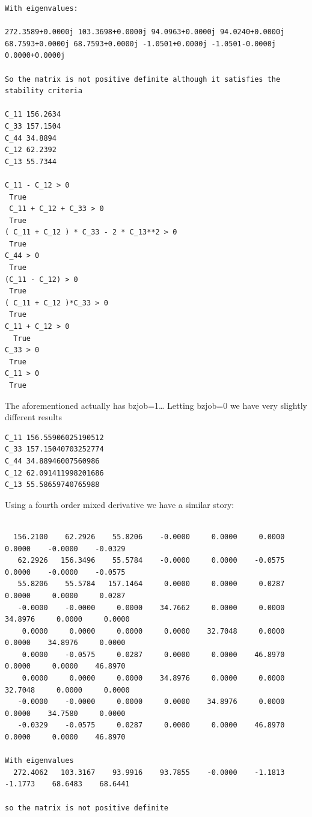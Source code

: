 \documentclass[11pt]{article}
\begin{document}
\begin{enumerate}
\begin{enumerate}
\begin{enumerate}
\begin{enumerate}
\begin{verbatim}
With eigenvalues:

272.3589+0.0000j 103.3698+0.0000j 94.0963+0.0000j 94.0240+0.0000j 68.7593+0.0000j 68.7593+0.0000j -1.0501+0.0000j -1.0501-0.0000j 0.0000+0.0000j

So the matrix is not positive definite although it satisfies the stability criteria

C_11 156.2634
C_33 157.1504
C_44 34.8894
C_12 62.2392
C_13 55.7344

C_11 - C_12 > 0 
 True
 C_11 + C_12 + C_33 > 0 
 True
( C_11 + C_12 ) * C_33 - 2 * C_13**2 > 0 
 True
C_44 > 0 
 True
(C_11 - C_12) > 0
 True
( C_11 + C_12 )*C_33 > 0 
 True
C_11 + C_12 > 0
  True
C_33 > 0
 True
C_11 > 0
 True

\end{verbatim}

The aforementioned actually has bzjob=1\ldots{}
Letting bzjob=0 we have very slightly different results 
\begin{verbatim}
C_11 156.55906025190512
C_33 157.15040703252774
C_44 34.88946007560986
C_12 62.091411998201686
C_13 55.58659740765988
\end{verbatim}


Using a fourth order mixed derivative we have a similar story:

\begin{verbatim}

  156.2100    62.2926    55.8206    -0.0000     0.0000     0.0000     0.0000    -0.0000    -0.0329
   62.2926   156.3496    55.5784    -0.0000     0.0000    -0.0575     0.0000    -0.0000    -0.0575
   55.8206    55.5784   157.1464     0.0000     0.0000     0.0287     0.0000     0.0000     0.0287
   -0.0000    -0.0000     0.0000    34.7662     0.0000     0.0000    34.8976     0.0000     0.0000
    0.0000     0.0000     0.0000     0.0000    32.7048     0.0000     0.0000    34.8976     0.0000
    0.0000    -0.0575     0.0287     0.0000     0.0000    46.8970     0.0000     0.0000    46.8970
    0.0000     0.0000     0.0000    34.8976     0.0000     0.0000    32.7048     0.0000     0.0000
   -0.0000    -0.0000     0.0000     0.0000    34.8976     0.0000     0.0000    34.7580     0.0000
   -0.0329    -0.0575     0.0287     0.0000     0.0000    46.8970     0.0000     0.0000    46.8970

With eigenvalues
  272.4062   103.3167    93.9916    93.7855    -0.0000    -1.1813    -1.1773    68.6483    68.6441

so the matrix is not positive definite


\end{verbatim}
\end{enumerate}
\end{enumerate}
\end{enumerate}
\end{enumerate}
\end{document}
